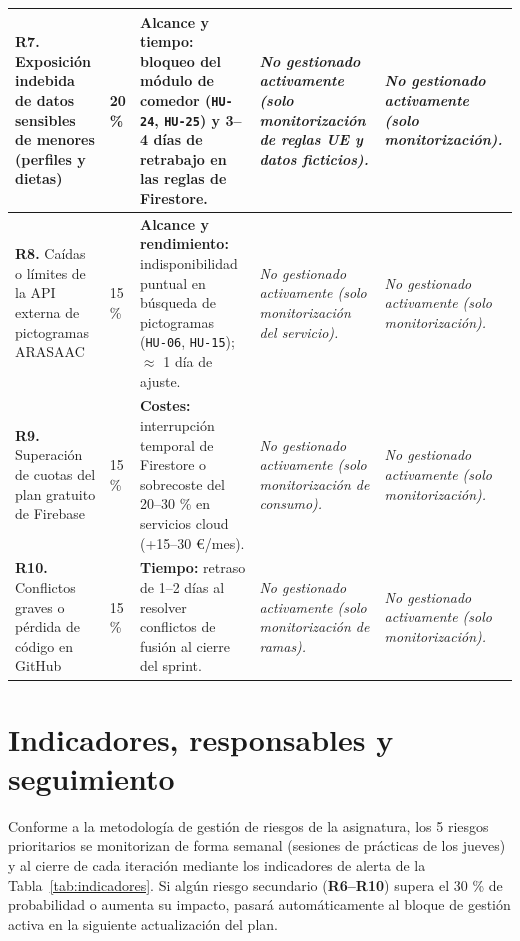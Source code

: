 \documentclass[11pt,a4paper]{article}
\begin{document}
{\begin{longtable}{@{}L{2.7cm} C{1.0cm} L{3.55cm} L{4.05cm} L{4.05cm}@{}}
  \textbf{R7.} Exposición indebida de datos sensibles de menores (perfiles y dietas) &
  20 \% &
  \textbf{Alcance y tiempo:} bloqueo del módulo de comedor (\texttt{HU-24}, \texttt{HU-25}) y 3--4 días de retrabajo en las reglas de Firestore. &
  \textit{\color{avamuted}No gestionado activamente (solo monitorización de reglas UE y datos ficticios).} &
  \textit{\color{avamuted}No gestionado activamente (solo monitorización).} \\
  \midrule

  \textbf{R8.} Caídas o límites de la API externa de pictogramas ARASAAC &
  15 \% &
  \textbf{Alcance y rendimiento:} indisponibilidad puntual en búsqueda de pictogramas (\texttt{HU-06}, \texttt{HU-15}); $\approx$ 1 día de ajuste. &
  \textit{\color{avamuted}No gestionado activamente (solo monitorización del servicio).} &
  \textit{\color{avamuted}No gestionado activamente (solo monitorización).} \\
  \midrule

  \textbf{R9.} Superación de cuotas del plan gratuito de Firebase &
  15 \% &
  \textbf{Costes:} interrupción temporal de Firestore o sobrecoste del 20--30 \% en servicios cloud (+15--30 €/mes). &
  \textit{\color{avamuted}No gestionado activamente (solo monitorización de consumo).} &
  \textit{\color{avamuted}No gestionado activamente (solo monitorización).} \\
  \midrule

  \textbf{R10.} Conflictos graves o pérdida de código en GitHub &
  15 \% &
  \textbf{Tiempo:} retraso de 1--2 días al resolver conflictos de fusión al cierre del sprint. &
  \textit{\color{avamuted}No gestionado activamente (solo monitorización de ramas).} &
  \textit{\color{avamuted}No gestionado activamente (solo monitorización).} \\
\end{longtable}
}

\newpage
\section{Indicadores, responsables y seguimiento}

Conforme a la metodología de gestión de riesgos de la asignatura, los 5 riesgos prioritarios se monitorizan de forma semanal (sesiones de prácticas de los jueves) y al cierre de cada iteración mediante los indicadores de alerta de la Tabla~\ref{tab:indicadores}. Si algún riesgo secundario (\textbf{R6--R10}) supera el 30 \% de probabilidad o aumenta su impacto, pasará automáticamente al bloque de gestión activa en la siguiente actualización del plan.
\end{document}

